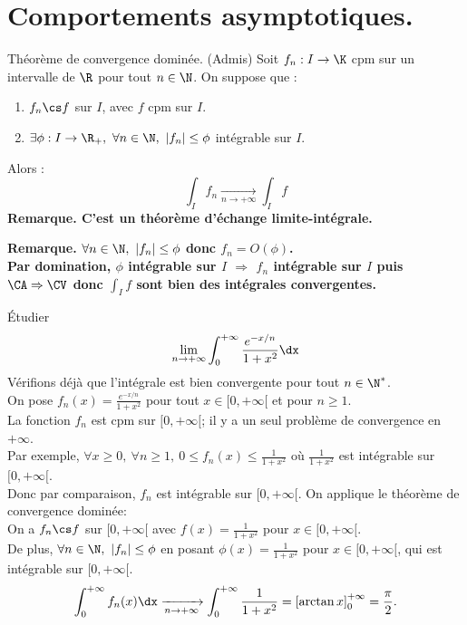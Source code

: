 \documentclass[11pt]{article}
\begin{document}


\section{Comportements asymptotiques.}

\begin{thm}{Théorème de convergence dominée. (Admis)}{}
    Soit $f_n:I\to\K$ cpm sur un intervalle de $\R$ pour tout $n\in\N$. On suppose que :
    \begin{enumerate}
        \item $f_n\cs f$ sur $I$, avec $f$ cpm sur $I$.
        \item $\exists \phi : I\to\R_+, ~ \forall n \in \N, ~ |f_n|\leq \phi$ intégrable sur $I$.
    \end{enumerate}
    Alors :
    \begin{equation*}
        \int_I f_n \xrightarrow[n\to+\infty]{}\int_I f
    \end{equation*}
    \bf{Remarque.} C'est un théorème d'échange limite-intégrale.
\end{thm}

\vspace*{-0.7cm}

\bf{Remarque.} $\forall n \in \N, ~ |f_n|\leq\phi$ donc $f_n=O(\phi)$.\\
Par domination, $\phi$ intégrable sur $I$ $\Rightarrow$ $f_n$ intégrable sur $I$ puis $\CA\Rightarrow\CV$ donc $\int_I f$ sont bien des intégrales convergentes. 

\begin{ex}{}{}
    Étudier
    \begin{equation*}
        \lim_{n\to+\infty} \int_0^{+\infty} \frac{e^{-x/n}}{1+x^2}\dx
    \end{equation*}
    \tcblower
    Vérifions déjà que l'intégrale est bien convergente pour tout $n\in\N^*$.\\
    On pose $f_n(x)=\frac{e^{-x/n}}{1+x^2}$ pour tout $x\in[0,+\infty[$ et pour $n\geq1$.\\
    La fonction $f_n$ est cpm sur $[0,+\infty[$; il y a un seul problème de convergence en $+\infty$.\\
    Par exemple, $\forall x \geq 0, ~ \forall n \geq 1, ~ 0 \leq f_n(x) \leq \frac{1}{1+x^2}$ où $\frac{1}{1+x^2}$ est intégrable sur $[0,+\infty[$.\\
    Donc par comparaison, $f_n$ est intégrable sur $[0,+\infty[$. On applique le théorème de convergence dominée:\\
    On a $f_n\cs f$ sur $[0,+\infty[$ avec $f(x)=\frac{1}{1+x^2}$ pour $x\in[0,+\infty[$.\\
    De plus, $\forall n \in \N, ~ |f_n|\leq\phi$ en posant $\phi(x)=\frac{1}{1+x^2}$ pour $x\in[0,+\infty[$, qui est intégrable sur $[0,+\infty[$.
    \begin{equation*}
        \int_0^{+\infty}f_n(x)\dx \xrightarrow[n\to+\infty]{}\int_0^{+\infty}\frac{1}{1+x^2}=\left[ \arctan x \right]_{0}^{+\infty} = \frac{\pi}{2}.
    \end{equation*}
\end{ex}
\end{document}
